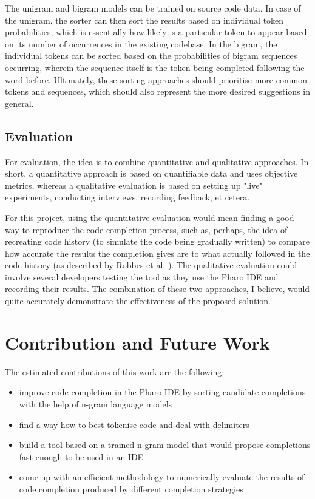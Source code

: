 \documentclass[sigconf,screen]{acmart}
\begin{document}
The unigram and bigram models can be trained on source code data. In case of the unigram, the sorter can then sort the results based on individual token probabilities, which is essentially how likely is a particular token to appear based on its number of occurrences in the existing codebase. In the bigram, the individual tokens can be sorted based on the probabilities of bigram sequences occurring, wherein the sequence itself is the token being completed following the word before. Ultimately, these sorting approaches should prioritise more common tokens and sequences, which should also represent the more desired suggestions in general.

\balance

\subsection{Evaluation}
For evaluation, the idea is to combine quantitative and qualitative approaches. In short, a quantitative approach is based on quantifiable data and uses objective metrics, whereas a qualitative evaluation is based on setting up "live" experiments, conducting interviews, recording feedback, et cetera.

For this project, using the quantitative evaluation would mean finding a good way to reproduce the code completion process, such as, perhaps, the idea of recreating code history (to simulate the code being gradually written) to compare how accurate the results the completion gives are to what actually followed in the code history (as described by Robbes et al. \cite{Robb08a}). The qualitative evaluation could involve several developers testing the tool as they use the Pharo IDE and recording their results. The combination of these two approaches, I believe, would quite accurately demonstrate the effectiveness of the proposed solution.

\section{Contribution and Future Work}
The estimated contributions of this work are the following:
\begin{itemize}
  \item improve code completion in the Pharo IDE by sorting candidate completions with the help of n-gram language models
  \item find a way how to best tokenise code and deal with delimiters
  \item build a tool based on a trained n-gram model that would propose completions fast enough to be used in an IDE
  \item come up with an efficient methodology to numerically evaluate the results of code completion produced by different completion strategies
\end{itemize}
\end{document}
